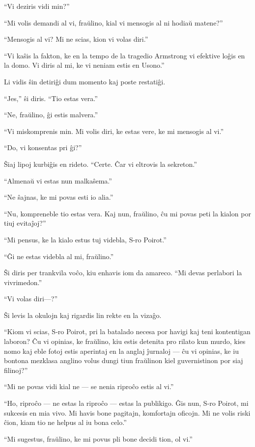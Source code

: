 ``Vi deziris vidi min?''

``Mi volis demandi al vi, fraŭlino, kial vi mensogis al ni hodiaŭ matene?''

``Mensogis al vi? Mi ne scias, kion vi volas diri.''

``Vi kaŝis la fakton, ke en la tempo de la tragedio Armstrong vi efektive loĝis en la domo. Vi diris al mi, ke vi neniam estis en Usono.''

Li vidis ŝin detiriĝi dum momento kaj poste restatiĝi.

``Jes,'' ŝi diris. ``Tio estas vera.''

``Ne, fraŭlino, ĝi estis malvera.''

``Vi miskomprenis min. Mi volis diri, ke estas vere, ke mi mensogis al vi.''

``Do, vi konsentas pri ĝi?''

Ŝiaj lipoj kurbiĝis en rideto. ``Certe. Ĉar vi eltrovis la sekreton.''

``Almenaŭ vi estas nun malkaŝema.''

``Ne ŝajnas, ke mi povas esti io alia.''

``Nu, kompreneble tio estas vera. Kaj nun, fraŭlino, ĉu mi povas peti la kialon por tiuj evitaĵoj?''

``Mi pensus, ke la kialo estus tuj videbla, S-ro Poirot.''

``Ĝi ne estas videbla al mi, fraŭlino.''

Ŝi diris per trankvila voĉo, kiu enhavis iom da amareco. ``Mi devas perlabori la vivrimedon.''

``Vi volas diri---?''

Ŝi levis la okulojn kaj rigardis lin rekte en la vizaĝo.

``Kiom vi scias, S-ro Poirot, pri la batalado necesa por havigi kaj teni kontentigan laboron? Ĉu vi opinias, ke fraŭlino, kiu estis detenita pro rilato kun murdo, kies nomo kaj eble fotoj estis aperintaj en la anglaj ĵurnaloj --- ĉu vi opinias, ke iu bontona mezklasa anglino volus dungi tiun fraŭlinon kiel guvernistinon por siaj filinoj?''

``Mi ne povas vidi kial ne --- se nenia riproĉo estis al vi.''

``Ho, riproĉo --- ne estas la riproĉo --- estas la publikigo. Ĝis nun, S-ro Poirot, mi sukcesis en mia vivo. Mi havis bone pagitajn, komfortajn oficojn. Mi ne volis riski ĉion, kiam tio ne helpus al iu bona celo.''

``Mi sugestus, fraŭlino, ke mi povus pli bone decidi tion, ol vi.''

